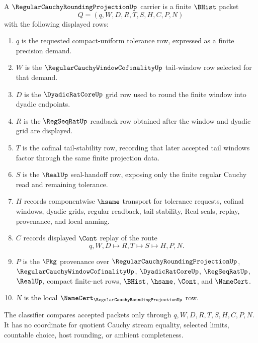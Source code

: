 \begin{definition}
\label{def:regular-cauchy-rounding-projection-carrier}
A $\RegularCauchyRoundingProjectionUp$ carrier is a finite $\BHist$ packet
$$
Q=(q,W,D,R,T,S,H,C,P,N)
$$
with the following displayed rows:
\begin{enumerate}
\item $q$ is the requested compact-uniform tolerance row, expressed as a finite precision demand.
\item $W$ is the $\RegularCauchyWindowCofinalityUp$ tail-window row selected for that demand.
\item $D$ is the $\DyadicRatCoreUp$ grid row used to round the finite window into dyadic endpoints.
\item $R$ is the $\RegSeqRatUp$ readback row obtained after the window and dyadic grid are displayed.
\item $T$ is the cofinal tail-stability row, recording that later accepted tail windows factor through the same finite projection data.
\item $S$ is the $\RealUp$ seal-handoff row, exposing only the finite regular Cauchy read and remaining tolerance.
\item $H$ records componentwise $\hsame$ transport for tolerance requests, cofinal windows, dyadic grids, regular readback, tail stability, Real seals, replay, provenance, and local naming.
\item $C$ records displayed $\Cont$ replay of the route
$$
q,W,D \longmapsto R,T \longmapsto S \longmapsto H,P,N .
$$
\item $P$ is the $\Pkg$ provenance over $\RegularCauchyRoundingProjectionUp$, $\RegularCauchyWindowCofinalityUp$, $\DyadicRatCoreUp$, $\RegSeqRatUp$, $\RealUp$, compact finite-net rows, $\BHist$, $\hsame$, $\Cont$, and $\NameCert$.
\item $N$ is the local $\NameCert_{\RegularCauchyRoundingProjectionUp}$ row.
\end{enumerate}
The classifier compares accepted packets only through $q,W,D,R,T,S,H,C,P,N$. It has no coordinate for quotient Cauchy stream equality, selected limits, countable choice, host rounding, or ambient completeness.
\end{definition}

